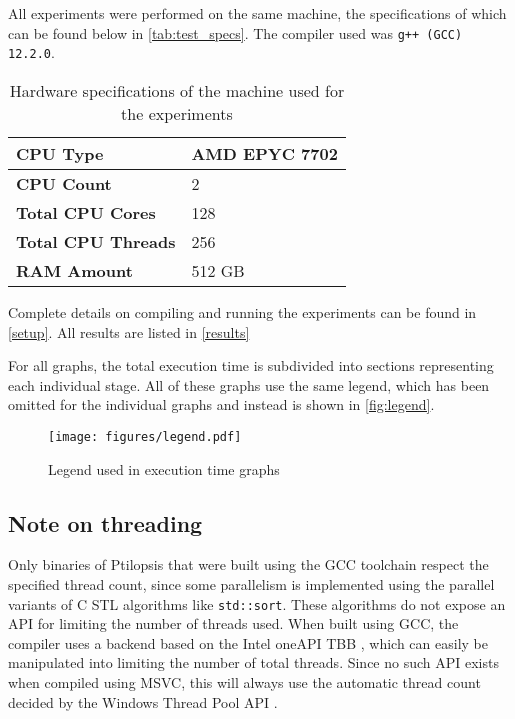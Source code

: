 \documentclass[12pt,dvipsnames]{article}
\newcommand{\icpp}[1]{\texttt{#1}}
\newcommand{\mono}[1]{\texttt{#1}}
\newcommand{\Rplus}{\protect\hspace{-.1em}\protect\raisebox{.35ex}{\smaller{\smaller\textbf{+}}}}
\newcommand{\Cpp}{\mbox{C\Rplus\Rplus}\xspace}
\begin{document}
All experiments were performed on the same machine, the specifications of which can be found below in \autoref{tab:test_specs}. The compiler used was \mono{g++ (GCC) 12.2.0}.

\begin{table}[ht]
    \centering
    \begin{tabular}{|l|l|}
        \hline
        \textbf{CPU Type} & AMD EPYC 7702 \\
        \hline
        \textbf{CPU Count} & 2 \\
        \hline
        \textbf{Total CPU Cores} & 128 \\
        \hline
        \textbf{Total CPU Threads} & 256 \\
        \hline
        \textbf{RAM Amount} & 512 GB \\
        \hline
    \end{tabular}
    \caption{Hardware specifications of the machine used for the experiments}
    \label{tab:test_specs}
\end{table}

Complete details on compiling and running the experiments can be found in \autoref{setup}. All results are listed in \autoref{results}

For all graphs, the total execution time is subdivided into sections representing each individual stage. All of these graphs use the same legend, which has been omitted for the individual graphs and instead is shown in \autoref{fig:legend}.

\begin{figure}[ht]
    \centering
    \texttt{[image: figures/legend.pdf]}
    \caption{Legend used in execution time graphs}
    \label{fig:legend}
\end{figure}

\subsection*{Note on threading}
Only binaries of Ptilopsis that were built using the GCC toolchain respect the specified thread count, since some parallelism is implemented using the parallel variants of \Cpp STL algorithms like \icpp{std::sort}. These algorithms do not expose an API for limiting the number of threads used. When built using GCC, the compiler uses a backend based on the Intel oneAPI TBB \cite{oneapi}, which can easily be manipulated into limiting the number of total threads. Since no such API exists when compiled using MSVC, this will always use the automatic thread count decided by the Windows Thread Pool API \cite{win32threadpool}.
\end{document}

